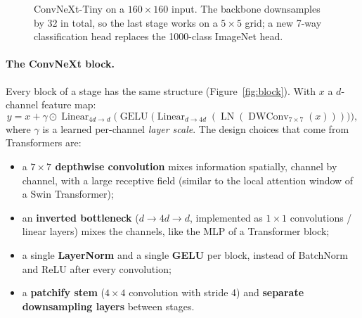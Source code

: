 \documentclass[11pt,a4paper]{article}
\begin{document}
\begin{figure}[H]
\caption{ConvNeXt-Tiny on a $160\times160$ input. The backbone downsamples by 32 in total, so the last
stage works on a $5\times5$ grid; a new 7-way classification head replaces the 1000-class ImageNet head.}
\label{fig:archi}
\end{figure}

\paragraph{The ConvNeXt block.} Every block of a stage has the same structure (Figure~\ref{fig:block}).
With $x$ a $d$-channel feature map:
\begin{equation}
  y = x + \gamma\odot\operatorname{Linear}_{4d\to d}\!\Big(\operatorname{GELU}\big(\operatorname{Linear}_{d\to4d}(\operatorname{LN}(\operatorname{DWConv}_{7\times7}(x)))\big)\Big),
\end{equation}
where $\gamma$ is a learned per-channel \emph{layer scale}. The design choices that come from Transformers are:
\begin{itemize}
  \item a \textbf{$7\times7$ depthwise convolution} mixes information spatially, channel by channel,
  with a large receptive field (similar to the local attention window of a Swin Transformer);
  \item an \textbf{inverted bottleneck} ($d\to4d\to d$, implemented as $1\times1$ convolutions /
  linear layers) mixes the channels, like the MLP of a Transformer block;
  \item a single \textbf{LayerNorm} and a single \textbf{GELU} per block, instead of BatchNorm and ReLU
  after every convolution;
  \item a \textbf{patchify stem} ($4\times4$ convolution with stride 4) and \textbf{separate
  downsampling layers} between stages.
\end{itemize}
\end{document}
